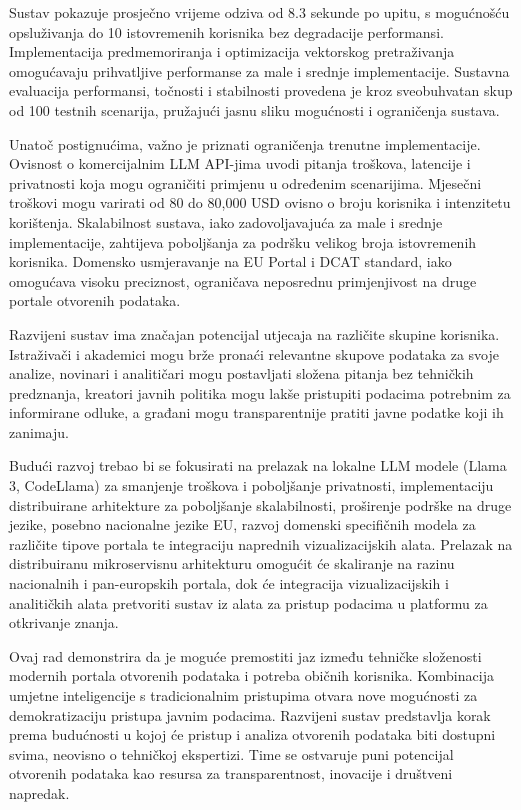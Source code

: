 Sustav pokazuje prosječno vrijeme odziva od 8.3 sekunde po upitu, s mogućnošću opsluživanja do 10 istovremenih korisnika bez degradacije performansi. Implementacija predmemoriranja i optimizacija vektorskog pretraživanja omogućavaju prihvatljive performanse za male i srednje implementacije. Sustavna evaluacija performansi, točnosti i stabilnosti provedena je kroz sveobuhvatan skup od 100 testnih scenarija, pružajući jasnu sliku mogućnosti i ograničenja sustava.

Unatoč postignućima, važno je priznati ograničenja trenutne implementacije. Ovisnost o komercijalnim LLM API-jima uvodi pitanja troškova, latencije i privatnosti koja mogu ograničiti primjenu u određenim scenarijima. Mjesečni troškovi mogu varirati od 80 do 80,000 USD ovisno o broju korisnika i intenzitetu korištenja. Skalabilnost sustava, iako zadovoljavajuća za male i srednje implementacije, zahtijeva poboljšanja za podršku velikog broja istovremenih korisnika. Domensko usmjeravanje na EU Portal i DCAT standard, iako omogućava visoku preciznost, ograničava neposrednu primjenjivost na druge portale otvorenih podataka.

Razvijeni sustav ima značajan potencijal utjecaja na različite skupine korisnika. Istraživači i akademici mogu brže pronaći relevantne skupove podataka za svoje analize, novinari i analitičari mogu postavljati složena pitanja bez tehničkih predznanja, kreatori javnih politika mogu lakše pristupiti podacima potrebnim za informirane odluke, a građani mogu transparentnije pratiti javne podatke koji ih zanimaju.

Budući razvoj trebao bi se fokusirati na prelazak na lokalne LLM modele (Llama 3, CodeLlama) za smanjenje troškova i poboljšanje privatnosti, implementaciju distribuirane arhitekture za poboljšanje skalabilnosti, proširenje podrške na druge jezike, posebno nacionalne jezike EU, razvoj domenski specifičnih modela za različite tipove portala te integraciju naprednih vizualizacijskih alata. Prelazak na distribuiranu mikroservisnu arhitekturu omogućit će skaliranje na razinu nacionalnih i pan-europskih portala, dok će integracija vizualizacijskih i analitičkih alata pretvoriti sustav iz alata za pristup podacima u platformu za otkrivanje znanja.

Ovaj rad demonstrira da je moguće premostiti jaz između tehničke složenosti modernih portala otvorenih podataka i potreba običnih korisnika. Kombinacija umjetne inteligencije s tradicionalnim pristupima otvara nove mogućnosti za demokratizaciju pristupa javnim podacima. Razvijeni sustav predstavlja korak prema budućnosti u kojoj će pristup i analiza otvorenih podataka biti dostupni svima, neovisno o tehničkoj ekspertizi. Time se ostvaruje puni potencijal otvorenih podataka kao resursa za transparentnost, inovacije i društveni napredak. 